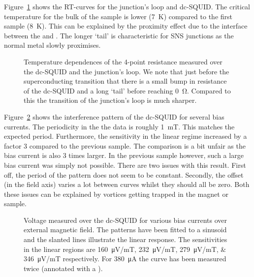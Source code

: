 Figure~\ref{fig:CP2.6B_RT_curves} shows the RT-curves for the junction's loop and dc-SQUID. The critical temperature for the bulk of the sample is lower (\qty{7}{\kelvin}) compared to the first sample (\qty{8}{\kelvin}). This can be explained by the proximity effect due to the interface between the  and .\cite{cirilloSuperconductingProximityEffect2005} The longer `tail' is characteristic for SNS junctions as the normal metal slowly proximises.

\begin{figure}[ht!]
	\centering
	
	\caption{Temperature dependences of the 4-point resistance measured over the dc-SQUID and the junction's loop. We note that just before the superconducting transition that there is a small bump in resistance of the dc-SQUID and a long `tail' before reaching \qty{0}{\ohm}. Compared to this the transition of the junction's loop is much sharper.}
	\label{fig:CP2.6B_RT_curves}
\end{figure}

Figure~\ref{fig:CP2.6B_SQUID_calibration_curves} shows the interference pattern of the dc-SQUID for several bias currents. The periodicity in the the data is roughly \qty{1}{\milli\tesla}. This matches the expected period. Furthermore, the sensitivity in the linear regime increased by a factor 3 compared to the previous sample. The comparison is a bit unfair as the bias current is also 3 times larger. In the previous sample however, such a large bias current was simply not possible. There are two issues with this result. First off, the period of the pattern does not seem to be constant. Secondly, the offset (in the field axis) varies a lot between curves whilst they should all be zero. Both these issues can be explained by vortices getting trapped in the magnet or sample. 

\begin{figure}[ht!]
	\centering
	
	\caption{Voltage measured over the dc-SQUID for various bias currents over external magnetic field. The patterns have been fitted to a sinusoid and the slanted lines illustrate the linear response. The sensitivities in the linear regions are \qtylist{160;232;279;346}{\micro\volt/\milli\tesla} respectively. For \qty{380}{\micro\ampere} the curve has been measured twice (annotated with a \dag).}
	\label{fig:CP2.6B_SQUID_calibration_curves}
\end{figure}

